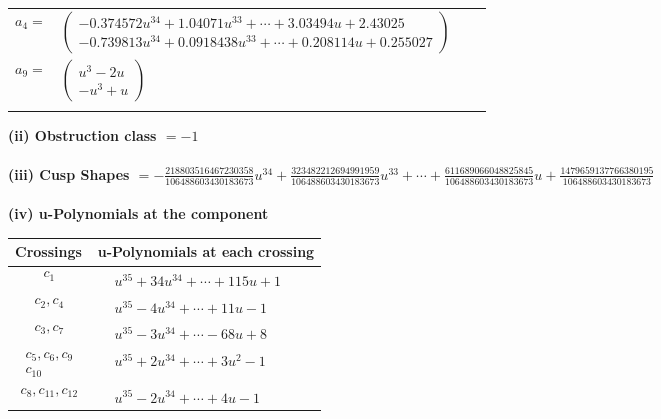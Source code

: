 \documentclass[1p]{elsarticle_modified}
\theoremstyle{definition}
\begin{document}
\begin{tabular}{m{7pt} m{180pt} m{7pt} m{180pt} }
\flushright $a_{4}=$&$\begin{pmatrix}-0.374572 u^{34}+1.04071 u^{33}+\cdots+3.03494 u+2.43025\\-0.739813 u^{34}+0.0918438 u^{33}+\cdots+0.208114 u+0.255027\end{pmatrix}$ \\
\flushright $a_{9}=$&$\begin{pmatrix}u^3-2 u\\- u^3+u\end{pmatrix}$\\&\end{tabular}
\flushleft \textbf{(ii) Obstruction class $= -1$}\\~\\
\flushleft \textbf{(iii) Cusp Shapes $= -\frac{218803516467230358}{106488603430183673} u^{34}+\frac{323482212694991959}{106488603430183673} u^{33}+\cdots+\frac{611689066048825845}{106488603430183673} u+\frac{1479659137766380195}{106488603430183673}$}\\~\\
\newpage\renewcommand{\arraystretch}{1}
\flushleft \textbf{(iv) u-Polynomials at the component}\newline \\
\begin{tabular}{m{50pt}|m{274pt}}
Crossings & \hspace{64pt}u-Polynomials at each crossing \\
\hline $$\begin{aligned}c_{1}\end{aligned}$$&$\begin{aligned}
&u^{35}+34 u^{34}+\cdots+115 u+1
\end{aligned}$\\
\hline $$\begin{aligned}c_{2},c_{4}\end{aligned}$$&$\begin{aligned}
&u^{35}-4 u^{34}+\cdots+11 u-1
\end{aligned}$\\
\hline $$\begin{aligned}c_{3},c_{7}\end{aligned}$$&$\begin{aligned}
&u^{35}-3 u^{34}+\cdots-68 u+8
\end{aligned}$\\
\hline $$\begin{aligned}c_{5},c_{6},c_{9}\\c_{10}\end{aligned}$$&$\begin{aligned}
&u^{35}+2 u^{34}+\cdots+3 u^2-1
\end{aligned}$\\
\hline $$\begin{aligned}c_{8},c_{11},c_{12}\end{aligned}$$&$\begin{aligned}
&u^{35}-2 u^{34}+\cdots+4 u-1
\end{aligned}$\\
\hline
\end{tabular}\\~\\
\end{document}
